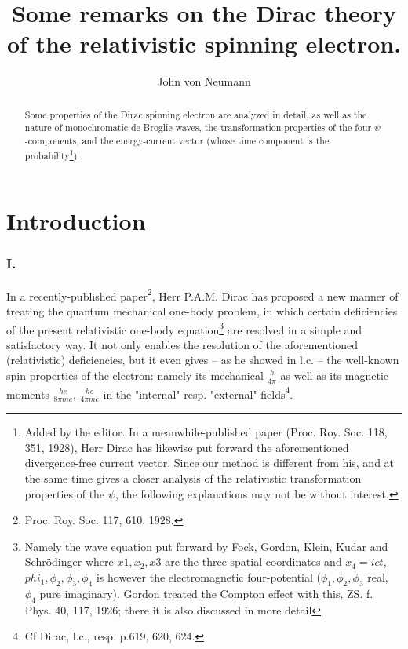 \begin{paper}{1}
\begin{header}
\title{Some remarks on the Dirac theory of the relativistic spinning electron.}
\author{John von Neumann}
\makeheader
\end{header}


\begin{abstract}
Some properties of the Dirac spinning electron are analyzed in detail, as well as the nature of monochromatic de Broglie waves, the transformation properties of the four $\psi$-components, and the energy-current vector (whose time component is the probability\footnote{Added by the editor. In a meanwhile-published paper (Proc. Roy. Soc. 118, 351, 1928), Herr Dirac has likewise put forward the aforementioned divergence-free current vector. Since our method is different from his, and at the same time gives a closer analysis of the relativistic transformation properties of the $\psi$, the following explanations may not be without interest.}).
\end{abstract}

\part*{Introduction}
\section*{I.} In a recently-published paper\footnote{Proc. Roy. Soc. 117, 610, 1928.}, Herr P.A.M. Dirac has proposed a new manner of treating the quantum mechanical one-body problem, in which certain deficiencies of the present relativistic one-body equation\footnote{Namely the wave equation put forward by Fock, Gordon, Klein, Kudar and Schr\"odinger
where $x1,x_2,x3$ are the three spatial coordinates and $x_4=ict$, $phi_1,\phi_2,\phi_3,\phi_4$ is however the electromagnetic four-potential ($\phi_1,\phi_2,\phi_3$ real, $\phi_4$ pure imaginary). Gordon treated the Compton effect with this, ZS. f. Phys. 40, 117, 1926; there it is also discussed in more detail} are resolved in a simple and satisfactory way. It not only enables the resolution of the aforementioned (relativistic) deficiencies, but it even gives -- as he showed in l.c. --  the well-known spin properties of the electron: namely its mechanical  $\frac{h}{4\pi}$ as well as its magnetic moments $\frac{he}{8\pi mc}$, $\frac{he}{4\pi mc}$ in the "internal" resp. "external" fields\footnote{Cf Dirac, l.c., resp. p.619, 620, 624.}.


\end{paper}
